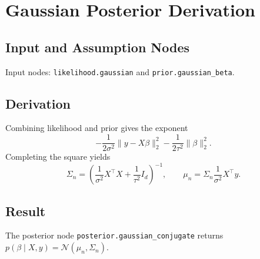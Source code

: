 \section{Gaussian Posterior Derivation}
\label{deriv:gaussian-posterior}

\subsection{Input and Assumption Nodes}
Input nodes: \texttt{likelihood.gaussian} and \texttt{prior.gaussian\_beta}.

\subsection{Derivation}
Combining likelihood and prior gives the exponent
\[
  -\frac{1}{2\sigma^2}\|y-X\beta\|_2^2
  -
  \frac{1}{2\tau^2}\|\beta\|_2^2.
\]
Completing the square yields
\[
  \Sigma_n =
  \left(\frac{1}{\sigma^2}X^\top X+\frac{1}{\tau^2}I_d\right)^{-1},
  \qquad
  \mu_n = \Sigma_n\frac{1}{\sigma^2}X^\top y.
\]

\subsection{Result}
The posterior node \texttt{posterior.gaussian\_conjugate} returns \(p(\beta\mid X,y)=\mathcal{N}(\mu_n,\Sigma_n)\).

